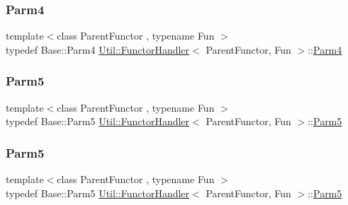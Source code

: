 \mbox{\label{classUtil_1_1FunctorHandler_a2e8ca7556b379684e9b76029e77dd644}} 
\subsubsection{\texorpdfstring{Parm4}{Parm4}\hspace{0.1cm}{\footnotesize\ttfamily [3/3]}}
{\footnotesize\ttfamily template$<$class Parent\+Functor , typename Fun $>$ \\
typedef Base\+::\+Parm4 \mbox{\hyperlink{classUtil_1_1FunctorHandler}{Util\+::\+Functor\+Handler}}$<$ Parent\+Functor, Fun $>$\+::\mbox{\hyperlink{classUtil_1_1FunctorHandler_a2e8ca7556b379684e9b76029e77dd644}{Parm4}}}

\mbox{\label{classUtil_1_1FunctorHandler_aeb1492d58534bb15702063e862e459c6}} 
\subsubsection{\texorpdfstring{Parm5}{Parm5}\hspace{0.1cm}{\footnotesize\ttfamily [1/3]}}
{\footnotesize\ttfamily template$<$class Parent\+Functor , typename Fun $>$ \\
typedef Base\+::\+Parm5 \mbox{\hyperlink{classUtil_1_1FunctorHandler}{Util\+::\+Functor\+Handler}}$<$ Parent\+Functor, Fun $>$\+::\mbox{\hyperlink{classUtil_1_1FunctorHandler_aeb1492d58534bb15702063e862e459c6}{Parm5}}}

\mbox{\label{classUtil_1_1FunctorHandler_aeb1492d58534bb15702063e862e459c6}} 
\subsubsection{\texorpdfstring{Parm5}{Parm5}\hspace{0.1cm}{\footnotesize\ttfamily [2/3]}}
{\footnotesize\ttfamily template$<$class Parent\+Functor , typename Fun $>$ \\
typedef Base\+::\+Parm5 \mbox{\hyperlink{classUtil_1_1FunctorHandler}{Util\+::\+Functor\+Handler}}$<$ Parent\+Functor, Fun $>$\+::\mbox{\hyperlink{classUtil_1_1FunctorHandler_aeb1492d58534bb15702063e862e459c6}{Parm5}}}

